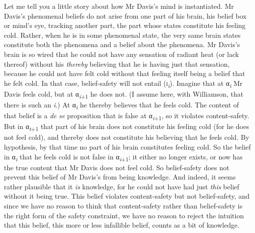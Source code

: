 \documentclass[
  10pt,
  letterpaper,
  DIV=11,
  numbers=noendperiod,
  twoside]{scrartcl}
\begin{document}
Let me tell you a little story about how Mr Davis's mind is
instantiated. Mr Davis's phenomenal beliefs do not arise from one part
of his brain, his belief box or mind's eye, tracking another part, the
part whose states constitute his feeling cold. Rather, when he is in
some phenomenal state, the very same brain states constitute both the
phenomena and a belief about the phenomena. Mr Davis's brain is so wired
that he could not have any sensation of radiant heat (or lack thereof)
without his \emph{thereby} believing that he is having just that
sensation, because he could not have felt cold without that feeling
itself being a belief that he felt cold. In that case, belief-safety
will not entail (\textsc{i}\textsubscript{\emph{i}}). Imagine that at
α\textsubscript{\emph{i}} Mr Davis feels cold, but at
α\textsubscript{\emph{i}+1} he does not. (I assume here, with
Williamson, that there is such an \emph{i}.) At
α\textsubscript{\emph{i}} he thereby believes that he feels cold. The
content of that belief is a \emph{de se} proposition that is false at
α\textsubscript{\emph{i}+1}, so it violates content-safety. But in
α\textsubscript{\emph{t}+1} that part of his brain does not constitute
his feeling cold (for he does not feel cold), and thereby does not
constitute his believing that he feels cold. By hypothesis, by that time
no part of his brain constitutes feeling cold. So the belief in
α\textsubscript{\emph{i}} that he feels cold is not false in
α\textsubscript{\emph{i}+1}; it either no longer exists, or now has the
true content that Mr Davis does not feel cold. So belief-safety does not
prevent this belief of Mr Davis's from being knowledge. And indeed, it
seems rather plausible that it \emph{is} knowledge, for he could not
have had just \emph{this} belief without it being true. This belief
violates content-safety but not belief-safety, and since we have no
reason to think that content-safety rather than belief-safety is the
right form of the safety constraint, we have no reason to reject the
intuition that this belief, this more or less infallible belief, counts
as a bit of knowledge.
\end{document}
